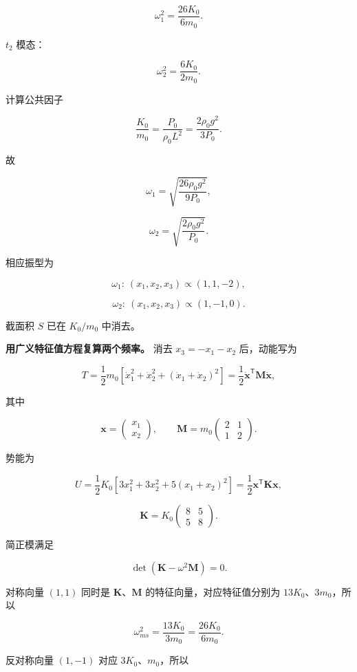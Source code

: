 \documentclass[12pt,a4paper,UTF8]{ctexart}
\begin{document}
\[
\omega_1^2=\frac{26K_0}{6m_0}.
\tag{19}
\]

\(t_2\) 模态：

\[
\omega_2^2=\frac{6K_0}{2m_0}.
\tag{20}
\]

计算公共因子

\[
\frac{K_0}{m_0}
=\frac{P_0}{\rho_0L^2}
=\frac{2\rho_0g^2}{3P_0}.
\tag{21}
\]

故

\[
\boxed{
\omega_1
=\sqrt{\frac{26\rho_0g^2}{9P_0}}
},
\tag{22}
\]

\[
\boxed{
\omega_2
=\sqrt{\frac{2\rho_0g^2}{P_0}}
}.
\tag{23}
\]

相应振型为

\[
\boxed{
\omega_1:\ (x_1,x_2,x_3)\propto(1,1,-2)
},
\tag{24}
\]

\[
\boxed{
\omega_2:\ (x_1,x_2,x_3)\propto(1,-1,0)
}.
\tag{25}
\]

截面积 \(S\) 已在 \(K_0/m_0\) 中消去。

\textbf{用广义特征值方程复算两个频率。} 消去 \(x_3=-x_1-x_2\)
后，动能写为

\[
T=\frac12m_0
\left[\dot x_1^2+\dot x_2^2+(\dot x_1+\dot x_2)^2\right]
=\frac12\dot{\boldsymbol x}^{\mathsf T}
\mathbf M\dot{\boldsymbol x},
\]

其中

\[
\boldsymbol x=
\begin{pmatrix}x_1\\x_2\end{pmatrix},
\qquad
\mathbf M=m_0
\begin{pmatrix}2&1\\1&2\end{pmatrix}.
\]

势能为

\[
U=\frac12K_0\left[3x_1^2+3x_2^2+5(x_1+x_2)^2\right]
=\frac12\boldsymbol x^{\mathsf T}\mathbf K\boldsymbol x,
\]

\[
\mathbf K=K_0
\begin{pmatrix}8&5\\5&8\end{pmatrix}.
\]

简正模满足

\[
\det(\mathbf K-\omega^2\mathbf M)=0.
\]

对称向量 \((1,1)\) 同时是 \(\mathbf K\)、\(\mathbf M\)
的特征向量，对应特征值分别为 \(13K_0\)、\(3m_0\)，所以

\[
\omega_{
m s}^2=\frac{13K_0}{3m_0}=\frac{26K_0}{6m_0}.
\]

反对称向量 \((1,-1)\) 对应 \(3K_0\)、\(m_0\)，所以
\end{document}

